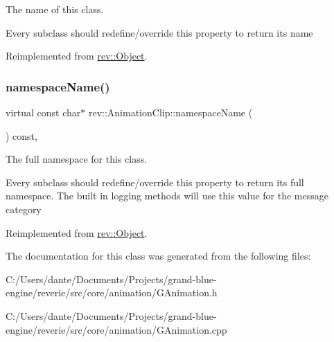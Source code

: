The name of this class. 

Every subclass should redefine/override this property to return its name 

Reimplemented from \mbox{\hyperlink{classrev_1_1_object_a7a2013f91169479b65cf93afdc5d9a68}{rev\+::\+Object}}.

\mbox{\label{classrev_1_1_animation_clip_aa6b49559406127733a258a373ce49694}} 
\subsubsection{\texorpdfstring{namespaceName()}{namespaceName()}}
{\footnotesize\ttfamily virtual const char$\ast$ rev\+::\+Animation\+Clip\+::namespace\+Name (\begin{DoxyParamCaption}{ }\end{DoxyParamCaption}) const\hspace{0.3cm}{\ttfamily [inline]}, {\ttfamily [virtual]}}



The full namespace for this class. 

Every subclass should redefine/override this property to return its full namespace. The built in logging methods will use this value for the message category 

Reimplemented from \mbox{\hyperlink{classrev_1_1_object_aaeb638d3e10f361c56c211a318a27f3d}{rev\+::\+Object}}.



The documentation for this class was generated from the following files\+:\begin{DoxyCompactItemize}
\item 
C\+:/\+Users/dante/\+Documents/\+Projects/grand-\/blue-\/engine/reverie/src/core/animation/G\+Animation.\+h\item 
C\+:/\+Users/dante/\+Documents/\+Projects/grand-\/blue-\/engine/reverie/src/core/animation/G\+Animation.\+cpp\end{DoxyCompactItemize}
